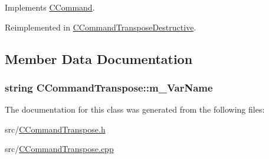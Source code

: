 Implements \hyperlink{classCCommand_ad9361ea814093c4ebecf22bb0a3f8b79}{C\+Command}.



Reimplemented in \hyperlink{classCCommandTransposeDestructive_ae71a2b525ece1435e335f0fe496d8e87}{C\+Command\+Transpose\+Destructive}.



\subsection{Member Data Documentation}
\subsubsection[{\texorpdfstring{m\+\_\+\+Var\+Name}{m_VarName}}]{\setlength{\rightskip}{0pt plus 5cm}string C\+Command\+Transpose\+::m\+\_\+\+Var\+Name\hspace{0.3cm}{\ttfamily [protected]}}\hypertarget{classCCommandTranspose_aa9eafd2768008a3f4585d65cbaa643b7}{}\label{classCCommandTranspose_aa9eafd2768008a3f4585d65cbaa643b7}


The documentation for this class was generated from the following files\+:\begin{DoxyCompactItemize}
\item 
src/\hyperlink{CCommandTranspose_8h}{C\+Command\+Transpose.\+h}\item 
src/\hyperlink{CCommandTranspose_8cpp}{C\+Command\+Transpose.\+cpp}\end{DoxyCompactItemize}
